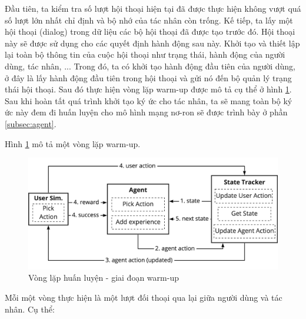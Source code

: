 Đầu tiên, ta kiểm tra số lượt hội thoại hiện tại đã được thực hiện
không vượt quá số lượt lớn nhất chỉ định và bộ nhớ của tác nhân
còn trống. Kế tiếp, ta lấy một hội thoại (dialog) trong dữ liệu
các bộ hội thoại đã được tạo trước đó. Hội thoại này sẽ được
sử dụng cho các quyết định hành động sau này. Khởi tạo và thiết lập
lại toàn bộ thông tin của cuộc hội thoại như trạng thái, hành động
của người dùng, tác nhân, ... Trong đó, ta có khởi tạo hành động
đầu tiên của người dùng, ở đây là lấy hành động đầu tiên trong
hội thoại và gửi nó đến bộ quản lý trạng thái hội thoại. Sau đó
thực hiện vòng lặp warm-up được mô tả cụ thể ở hình
\ref{fig:warmup}. Sau khi hoàn tất quá trình khởi tạo ký ức cho
tác nhân, ta sẽ mang toàn bộ ký ức này đem đi huấn luyện cho
mô hình mạng nơ-ron sẽ được trình bày ở phần \ref{subsec:agent}.

Hình \ref{fig:warmup} mô tả một vòng lặp warm-up.

\begin{figure}[ht!]
    \centering
    \includegraphics[scale=0.14]{thesis/chatbot/phuongphap/img/warmup.jpg}
    \caption{Vòng lặp huấn luyện - giai đoạn warm-up}
    \label{fig:warmup}
\end{figure}

Mỗi một vòng thực hiện là một lượt đối thoại qua lại giữa người dùng
và tác nhân. Cụ thể:

